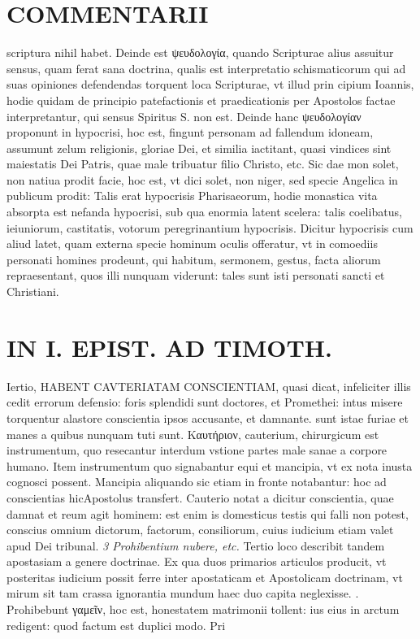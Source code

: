 \documentclass{article}
\begin{document}
\begin{pages}
\section*{COMMENTARII }
\marginpar{[ p.88 ]}\pstart scriptura nihil habet. Deinde est ψευδολογία, quando Scripturae alius assuitur sensus, quam ferat sana doctrina, qualis est interpretatio schismaticorum qui ad suas opiniones defendendas torquent loca Scripturae, vt illud prin cipium Ioannis, hodie quidam de principio patefactionis et praedicationis per Apostolos factae interpretantur, qui sensus Spiritus S. non est. Deinde hanc ψευδολογίαν proponunt in hypocrisi, hoc est, fingunt personam ad fallendum idoneam, assumunt zelum religionis, gloriae Dei, et similia iactitant, quasi vindices sint maiestatis Dei Patris, quae male tribuatur filio Christo, etc. Sic dae mon solet, non natiua prodit facie, hoc est, vt dici solet, non niger, sed specie Angelica in publicum prodit: Talis erat hypocrisis Pharisaeorum, hodie monastica vita absorpta est nefanda hypocrisi, sub qua enormia latent scelera: talis coelibatus, ieiuniorum, castitatis, votorum peregrinantium hypocrisis. Dicitur hypocrisis cum aliud latet, quam externa specie hominum oculis offeratur, vt in comoediis personati homines prodeunt, qui habitum, sermonem, gestus, facta aliorum repraesentant, quos illi nunquam viderunt: tales sunt isti personati sancti et Christiani.  \pend
\section*{IN I. EPIST. AD TIMOTH. }
\marginpar{[ p.89 ]}\pstart Iertio, HABENT CAVTERIATAM CONSCIENTIAM, quasi dicat, infeliciter illis cedit errorum defensio: foris splendidi sunt doctores, et Promethei: intus misere torquentur alastore conscientia ipsos accusante, et damnante. sunt istae furiae et manes a quibus nunquam tuti sunt. Καυτήριον, cauterium, chirurgicum est instrumentum, quo resecantur interdum vstione partes male sanae a corpore humano. Item instrumentum quo signabantur equi et mancipia, vt ex nota inusta cognosci possent. Mancipia aliquando sic etiam in fronte notabantur: hoc ad conscientias hicApostolus transfert. Cauterio notat a dicitur conscientia, quae damnat et reum agit hominem: est enim is domesticus testis qui falli non potest, conscius omnium dictorum, factorum, consiliorum, cuius iudicium etiam valet apud Dei tribunal.  \pend
\textit{3 Prohibentium nubere, etc. }\pstart Tertio loco describit tandem apostasiam a genere doctrinae. Ex qua duos primarios articulos producit, vt posteritas iudicium possit ferre inter apostaticam et Apostolicam doctrinam, vt mirum sit tam crassa ignorantia mundum haec duo capita neglexisse.  \pend{}. Prohibebunt γαμεῖν, hoc est, honestatem matrimonii tollent: ius eius in arctum redigent: quod factum est duplici modo. Pri\pend

\end{pages}
\end{document}
